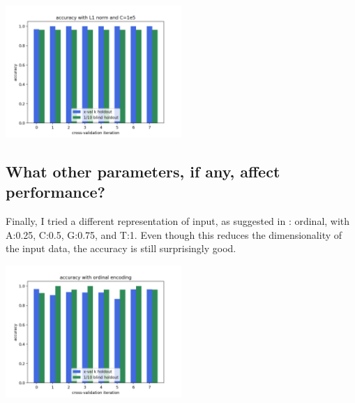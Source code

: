 \documentclass[]{article}
\begin{document}
\vspace{1em}
\includegraphics[width=0.5\textwidth]{xvalAccuracyL1c1e5.png}
\vspace{1em}

\subsection{What other parameters, if any, affect performance?}

Finally, I tried a different representation of input, as suggested in : ordinal, with A:0.25, C:0.5, G:0.75, and T:1. Even though this reduces the dimensionality of the input data, the accuracy is still surprisingly good.


\vspace{1em}
\includegraphics[width=0.5\textwidth]{xvalAccuracyOrdinal.png}
\vspace{1em}
\end{document}
